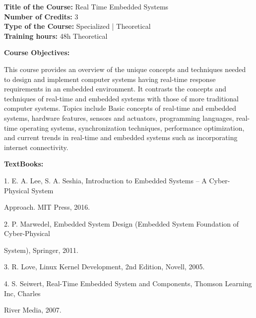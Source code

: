 \documentclass[12pt,a4paper]{article}
\begin{document}
\newpage
\textbf{Title of the Course:} Real Time Embedded Systems\\
\textbf{Number of Credits:} 3\\
\textbf{Type of the Course:} Specialized | Theoretical\\
\textbf{Training hours:} 48h Theoretical\par\vspace{4pt}
\textbf{Course Objectives:}\par\vspace{2pt}
This course provides an overview of the unique concepts and techniques needed to design and
implement computer systems having real-time response requirements in an embedded
environment. It contrasts the concepts and techniques of real-time and embedded systems with
those of more traditional computer systems. Topics include Basic concepts of real-time and
embedded systems, hardware features, sensors and actuators, programming languages, real-time
operating systems, synchronization techniques, performance optimization, and current trends in
real-time and embedded systems such as incorporating internet connectivity.\par\vspace{4pt}
\textbf{TextBooks:}\par\vspace{2pt}
1. E. A. Lee, S. A. Seshia, Introduction to Embedded Systems – A Cyber-Physical System\par
Approach. MIT Press, 2016.\par
2. P. Marwedel, Embedded System Design (Embedded System Foundation of Cyber-Physical\par
System), Springer, 2011.\par
3. R. Love, Linux Kernel Development, 2nd Edition, Novell, 2005.\par
4. S. Seiwert, Real-Time Embedded System and Components, Thomson Learning Inc, Charles\par
River Media, 2007.\par
\vspace{4pt}
\end{document}
